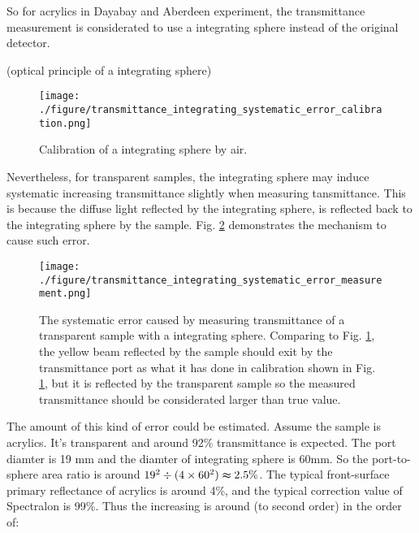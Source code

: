 So for acrylics in Dayabay and Aberdeen experiment, the transmittance measurement is
considerated to use a integrating sphere instead of the original detector.


(optical principle of a integrating sphere)
\begin{figure}
    \centering
    \texttt{[image: ./figure/transmittance\_integrating\_systematic\_error\_calibration.png]}
    \caption{Calibration of a integrating sphere by air.}
    \label{fig:transmittance_integrating_systematic_error_calibration.png}
    \end{figure}


Nevertheless, for transparent samples, the integrating sphere
may induce systematic increasing transmittance slightly when measuring tansmittance.
This is because the diffuse light reflected by the integrating
sphere, is reflected back to the integrating sphere by the sample.
Fig. \ref{fig:transmittance_integrating_systematic_error_measurement.png} demonstrates the mechanism to cause such error.


\begin{figure}
    \centering
    \texttt{[image: ./figure/transmittance\_integrating\_systematic\_error\_measurement.png]}
    \caption[Transmittance measurement of the integrating sphere error attributed by transparent sample.]
{The systematic error caused by measuring transmittance of a transparent sample with a integrating sphere.
Comparing to Fig. \ref{fig:transmittance_integrating_systematic_error_calibration.png}, the yellow beam reflected by the sample
should exit by the transmittance port as what it has done in calibration shown
in Fig. \ref{fig:transmittance_integrating_systematic_error_calibration.png}, but it is reflected by the transparent sample so
the measured transmittance should be considerated larger than true value.}
    \label{fig:transmittance_integrating_systematic_error_measurement.png}
    \end{figure}

The amount of this kind of error could be estimated. Assume the sample is acrylics. It's transparent and around 92\% transmittance
is expected. The port diamter is 19 mm and the diamter of integrating sphere is 60mm.
So the port-to-sphere area ratio is around ${19^2}\div({4\times60^2})\thickapprox2.5\%$.
The typical front-surface primary reflectance of acrylics is around 4\%, and the typical correction value of Spectralon is 99\%.
Thus the increasing is around (to second order) in the order of:


